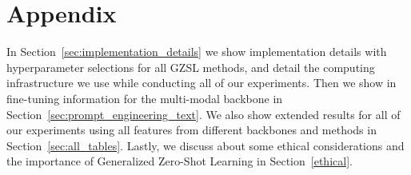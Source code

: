 \clearpage
\appendix

\section{Appendix}

In Section~\ref{sec:implementation_details} we show implementation details with hyperparameter selections for all GZSL methods, and detail the computing infrastructure we use while conducting all of our experiments. 
Then we show in fine-tuning information for the multi-modal backbone in Section~\ref{sec:prompt_engineering_text}.
We also show extended results for all of our experiments using all features from different backbones and methods in Section~\ref{sec:all_tables}.
Lastly, we discuss about some ethical considerations and the importance of Generalized Zero-Shot Learning in Section~\ref{ethical}.



